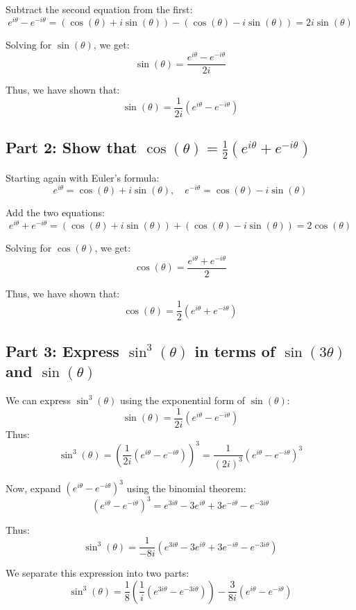 \documentclass[11pt]{article}
\begin{document}
Subtract the second equation from the first:
\[
e^{i\theta} - e^{-i\theta} = (\cos(\theta) + i\sin(\theta)) - (\cos(\theta) - i\sin(\theta)) = 2i\sin(\theta)
\]

Solving for \( \sin(\theta) \), we get:
\[
\sin(\theta) = \frac{e^{i\theta} - e^{-i\theta}}{2i}
\]

Thus, we have shown that:
\[
\sin(\theta) = \frac{1}{2i}(e^{i\theta} - e^{-i\theta})
\]

\newpage

\subsection{Part 2: Show that \( \cos(\theta) = \frac{1}{2}(e^{i\theta} + e^{-i\theta}) \)}

Starting again with Euler's formula:
\[
e^{i\theta} = \cos(\theta) + i\sin(\theta), \quad e^{-i\theta} = \cos(\theta) - i\sin(\theta)
\]

Add the two equations:
\[
e^{i\theta} + e^{-i\theta} = (\cos(\theta) + i\sin(\theta)) + (\cos(\theta) - i\sin(\theta)) = 2\cos(\theta)
\]

Solving for \( \cos(\theta) \), we get:
\[
\cos(\theta) = \frac{e^{i\theta} + e^{-i\theta}}{2}
\]

Thus, we have shown that:
\[
\cos(\theta) = \frac{1}{2}(e^{i\theta} + e^{-i\theta})
\]

\newpage

\subsection{Part 3: Express \( \sin^3(\theta) \) in terms of \( \sin(3\theta) \) and \( \sin(\theta) \)}

We can express \( \sin^3(\theta) \) using the exponential form of \( \sin(\theta) \):
\[
\sin(\theta) = \frac{1}{2i}(e^{i\theta} - e^{-i\theta})
\]
Thus:
\[
\sin^3(\theta) = \left( \frac{1}{2i}(e^{i\theta} - e^{-i\theta}) \right)^3 = \frac{1}{(2i)^3}(e^{i\theta} - e^{-i\theta})^3
\]

Now, expand \( (e^{i\theta} - e^{-i\theta})^3 \) using the binomial theorem:
\[
(e^{i\theta} - e^{-i\theta})^3 = e^{3i\theta} - 3e^{i\theta} + 3e^{-i\theta} - e^{-3i\theta}
\]

Thus:
\[
\sin^3(\theta) = \frac{1}{-8i}(e^{3i\theta} - 3e^{i\theta} + 3e^{-i\theta} - e^{-3i\theta})
\]

We separate this expression into two parts:
\[
\sin^3(\theta) = \frac{1}{8} \left( \frac{1}{i}(e^{3i\theta} - e^{-3i\theta}) \right) - \frac{3}{8i}(e^{i\theta} - e^{-i\theta})
\]
\end{document}
